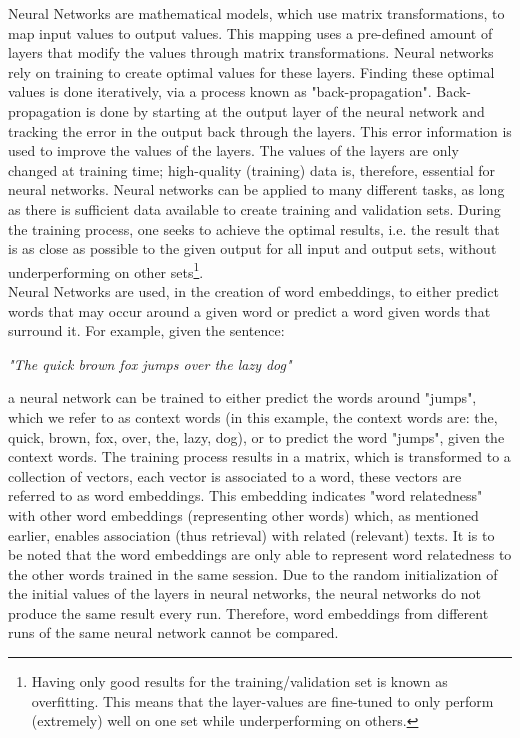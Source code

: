 \documentclass[../../Thesis.tex]{subfiles}
\begin{document}
Neural Networks are mathematical models\cite{funahashi1989approximate}, which use matrix transformations, to map input values to output values. This mapping uses a pre-defined amount of layers that modify the values through matrix transformations. Neural networks rely on training to create optimal values for these layers. Finding these optimal values is done iteratively, via a process known as "back-propagation". Back-propagation is done by starting at the output layer of the neural network and tracking the error in the output back through the layers. This error information is used to improve the values of the layers. The values of the layers are only changed at training time; high-quality (training) data is, therefore, essential for neural networks\cite{Truong2017Thesis, lai2016generate}. Neural networks can be applied to many different tasks, as long as there is sufficient data available to create training and validation sets. During the training process, one seeks to achieve the optimal results, i.e. the result that is as close as possible to the given output for all input and output sets, without underperforming on other sets\footnote{Having only good results for the training/validation set is known as overfitting. This means that the layer-values are fine-tuned to only perform (extremely) well on one set while underperforming on others.}.\\Neural Networks are used, in the creation of word embeddings, to either predict words that may occur around a given word or predict a word given words that surround it. For example, given the sentence:\\
\begin{center}
\textit{"The quick brown fox jumps over the lazy dog"}
\end{center}
a neural network can be trained to either predict the words around "jumps", which we refer to as context words (in this example, the context words are: the, quick, brown, fox, over, the, lazy, dog), or to predict the word "jumps", given the context words. The training process results in a matrix, which is transformed to a collection of vectors, each vector is associated to a word, these vectors are referred to as word embeddings. This embedding indicates "word relatedness" with other word embeddings (representing other words) which, as mentioned earlier, enables association (thus retrieval) with related (relevant) texts. It is to be noted that the word embeddings are only able to represent word relatedness to the other words trained in the same session. Due to the random initialization of the initial values of the layers in neural networks, the neural networks do not produce the same result every run. Therefore, word embeddings from different runs of the same neural network cannot be compared.
\end{document}
